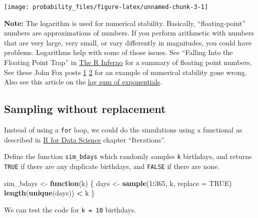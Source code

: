 \documentclass[]{book}
\newenvironment{Shaded}{\begin{snugshade}}{\end{snugshade}}
\newcommand{\KeywordTok}[1]{\textcolor[rgb]{0.13,0.29,0.53}{\textbf{#1}}}
\newcommand{\DataTypeTok}[1]{\textcolor[rgb]{0.13,0.29,0.53}{#1}}
\newcommand{\DecValTok}[1]{\textcolor[rgb]{0.00,0.00,0.81}{#1}}
\newcommand{\StringTok}[1]{\textcolor[rgb]{0.31,0.60,0.02}{#1}}
\newcommand{\OtherTok}[1]{\textcolor[rgb]{0.56,0.35,0.01}{#1}}
\newcommand{\ControlFlowTok}[1]{\textcolor[rgb]{0.13,0.29,0.53}{\textbf{#1}}}
\newcommand{\OperatorTok}[1]{\textcolor[rgb]{0.81,0.36,0.00}{\textbf{#1}}}
\newcommand{\NormalTok}[1]{#1}
\theoremstyle{definition}
\theoremstyle{definition}
\theoremstyle{definition}
\theoremstyle{remark}
\begin{document}
\begin{center}\texttt{[image: probability\_files/figure-latex/unnamed-chunk-3-1]} \end{center}

\textbf{Note:} The logarithm is used for numerical stability. Basically,
``floating-point'' numbers are approximations of numbers. If you perform
arithmetic with numbers that are very large, very small, or vary
differently in magnitudes, you could have problems. Logarithms help with
some of those issues. See ``Falling Into the Floating Point Trap'' in
\href{http://www.burns-stat.com/pages/Tutor/R_inferno.pdf}{The R
Inferno} for a summary of floating point numbers. See these John Fox
posts
\href{http://www.johndcook.com/blog/2008/09/26/comparing-three-methods-of-computing-standard-deviation/}{1}
\href{http://www.johndcook.com/blog/2008/09/28/theoretical-explanation-for-numerical-results/}{2}
for an example of numerical stability gone wrong. Also see this article
on the
\href{http://andrewgelman.com/2016/06/11/log-sum-of-exponentials/}{log
sum of exponentials}.

\subsection{Sampling without
replacement}\label{sampling-without-replacement}

Instead of using a \texttt{for} loop, we could do the simulations using
a functional as described in \href{http://r4ds.had.co.nz/}{R for Data
Science} chapter ``Iterations''.

Define the function \texttt{sim\_bdays} which randomly samples
\texttt{k} birthdays, and returns \texttt{TRUE} if there are any
duplicate birthdays, and \texttt{FALSE} if there are none.

\begin{Shaded}
\begin{Highlighting}[]
\NormalTok{sim_bdays <-}\StringTok{ }\ControlFlowTok{function}\NormalTok{(k) \{}
\NormalTok{  days <-}\StringTok{ }\KeywordTok{sample}\NormalTok{(}\DecValTok{1}\OperatorTok{:}\DecValTok{365}\NormalTok{, k, }\DataTypeTok{replace =} \OtherTok{TRUE}\NormalTok{)}
  \KeywordTok{length}\NormalTok{(}\KeywordTok{unique}\NormalTok{(days)) }\OperatorTok{<}\StringTok{ }\NormalTok{k}
\NormalTok{\}}
\end{Highlighting}
\end{Shaded}

We can test the code for \texttt{k\ =\ 10} birthdays.
\end{document}
